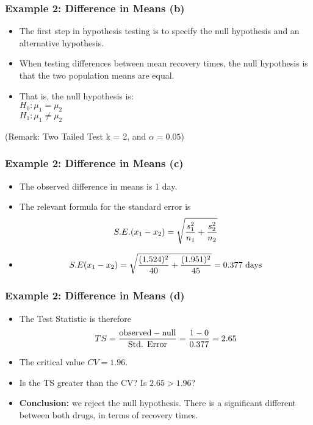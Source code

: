 \begin{frame}
\frametitle{Example 2: Difference in Means (b) }
\begin{itemize}
\item
The first step in hypothesis testing is to specify the null hypothesis and an alternative hypothesis.
\item When testing differences between mean recovery times, the null hypothesis is that the two population means are equal.
\item That is, the null hypothesis is:\\
$H_0: \mu_1 = \mu_2$\\
$H_1: \mu_1 \neq \mu_2$\\
\end{itemize}
(Remark: Two Tailed Test k = 2, and $\alpha = 0.05$)
\end{frame}

\begin{frame}
\frametitle{Example 2: Difference in Means (c) }
\begin{itemize}
\item The observed difference in means is 1 day.
\item The relevant formula for the standard error is \[ S.E.(x_1 - x_2) = \sqrt{{s^2_1\over n_1}+{s^2_2 \over n_2}} \]
\item  \[ S.E(x_1 - x_2) = \sqrt{{(1.524)^2 \over 40}+{(1.951)^2 \over 45}}  = 0.377\mbox{ days} \]
\end{itemize}
\end{frame}

\begin{frame}
\frametitle{Example 2: Difference in Means (d) }
\begin{itemize}
\item The Test Statistic is therefore
\[ TS = {\mbox{observed} - \mbox{null} \over \mbox{Std. Error}}  = {1 - 0 \over 0.377 } = 2.65 \]
\item The critical value $CV = 1.96$.
\item Is the TS greater than the CV? Is $2.65 > 1.96$?

\item \textbf{Conclusion:} we reject the null hypothesis. There is a significant different between both drugs, in terms of recovery times.

\end{itemize}
\end{frame}


